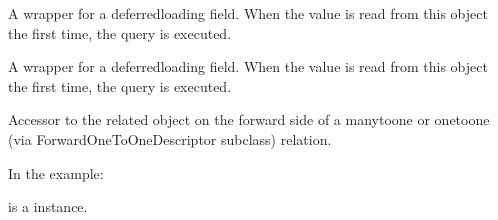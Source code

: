 \documentclass[letterpaper,10pt,french]{sphinxmanual}
\begin{document}
\begin{fulllineitems}

\begin{fulllineitems}
\label{\detokenize{main/model:main.models.Information.dateDebut}}
\pysigstartsignatures
{}
\pysigstopsignatures
\sphinxAtStartPar
A wrapper for a deferred\sphinxhyphen{}loading field. When the value is read from this
object the first time, the query is executed.

\end{fulllineitems}


\begin{fulllineitems}
\label{\detokenize{main/model:main.models.Information.dateFin}}
\pysigstartsignatures
{}
\pysigstopsignatures
\sphinxAtStartPar
A wrapper for a deferred\sphinxhyphen{}loading field. When the value is read from this
object the first time, the query is executed.

\end{fulllineitems}


\begin{fulllineitems}
\label{\detokenize{main/model:main.models.Information.directeur}}
\pysigstartsignatures
{}
\pysigstopsignatures
\sphinxAtStartPar
Accessor to the related object on the forward side of a many\sphinxhyphen{}to\sphinxhyphen{}one or
one\sphinxhyphen{}to\sphinxhyphen{}one (via ForwardOneToOneDescriptor subclass) relation.

\sphinxAtStartPar
In the example:

\begin{sphinxVerbatim}[commandchars=\\\{\}]
 
       
\end{sphinxVerbatim}

\sphinxAtStartPar
{} is a  instance.


\end{fulllineitems}
\end{fulllineitems}
\end{document}
